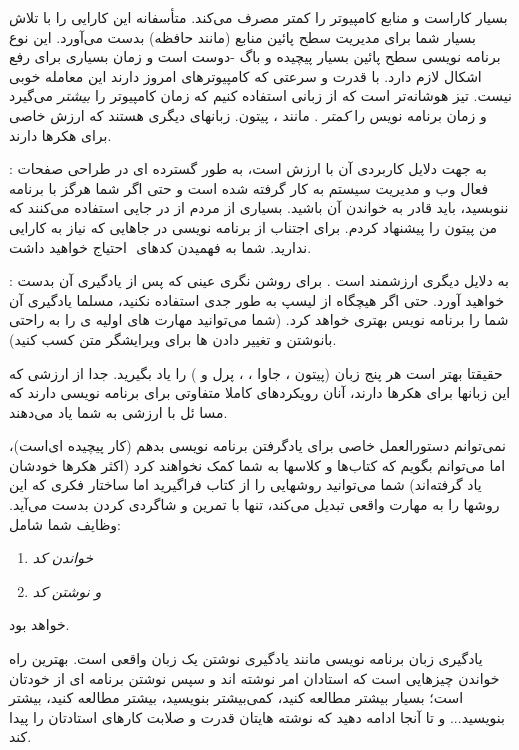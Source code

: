  بسیار کاراست و منابع کامپیوتر را کمتر مصرف می‌کند. متأسفانه  این کارایی را با تلاش بسیار شما برای مدیریت سطح پائین منابع (مانند حافظه) بدست می‌آورد. این نوع برنامه نویسی سطح پائین بسیار پیچیده و باگ -دوست است و زمان بسیاری برای رفع اشکال
 لازم دارد. با قدرت و سرعتی که کامپیوترهای امروز دارند این معامله خوبی نیست. تیز هوشانه‌تر است که از زبانی استفاده کنیم که زمان کامپیوتر را
\emph{بیشتر}
می‌گیرد و زمان برنامه نویس را
\emph{کمتر}
. مانند ، پیتون.
زبانهای دیگری هستند که ارزش خاصی برای هکرها دارند.

:
به جهت دلایل کاربردی آن با ارزش است، به طور گسترده ای در طراحی صفحات فعال وب و مدیریت سیستم به کار گرفته شده است و حتی اگر شما هرگز با
برنامه ننوبسید، باید قادر به خواندن آن باشید. بسیاری از مردم از 
 در جایی استفاده می‌کنند که من پیتون را پیشنهاد کردم. برای اجتناب از برنامه نویسی  در جاهایی که نیاز به کارایی  ندارید. شما به فهمیدن کدهای ‌
 احتیاج خواهید داشت.
 
:
به دلایل دیگری ارزشمند است . برای روشن نگری عینی که پس از یادگیری آن بدست خواهید آورد. حتی اگر هیچگاه از لیسپ به طور جدی استفاده نکنید، مسلما یادگیری آن شما را برنامه نویس بهتری خواهد کرد. (شما می‌توانید مهارت های اولیه ی‌
 را به راحتی بانوشتن و تغییر دادن 
ها برای ویرایشگر متن 
 کسب کنید).
 
حقیقتا بهتر است هر پنج زبان (پیتون ، جاوا ،
، پرل و 
) را یاد بگیرید. جدا از ارزشی که این زبانها برای هکرها دارند، آنان رویکردهای کاملا متفاوتی برای برنامه نویسی دارند که مسا ئل با ارزشی به شما یاد می‌دهند.

نمی‌توانم دستورالعمل خاصی برای یادگرفتن برنامه نویسی بدهم (کار پیچیده ای‌است)، اما می‌توانم بگویم که کتاب‌ها و کلاسها به شما کمک نخواهند کرد (اکثر هکرها خودشان یاد گرفته‌اند) شما می‌توانید روشهایی را از کتاب فراگیرید اما ساختار فکری که این روشها را به مهارت واقعی تبدیل می‌کند، تنها با تمرین و شاگردی کردن بدست می‌آید. وظایف شما شامل:
\begin{enumerate}
	\item \emph{خواندن کد}
	\item \emph{و نوشتن کد}
\end{enumerate}
خواهد بود.

یادگیری زبان برنامه نویسی مانند یادگیری نوشتن یک زبان واقعی است. بهترین راه خواندن چیزهایی است که استادان امر نوشته اند و سپس نوشتن برنامه ای از خودتان است؛ بسیار بیشتر مطالعه کنید، کمی‌بیشتر بنویسید، بیشتر مطالعه کنید، بیشتر بنویسید... و تا آنجا ادامه دهید که نوشته هایتان قدرت و صلابت کارهای استادتان را پیدا کند.

